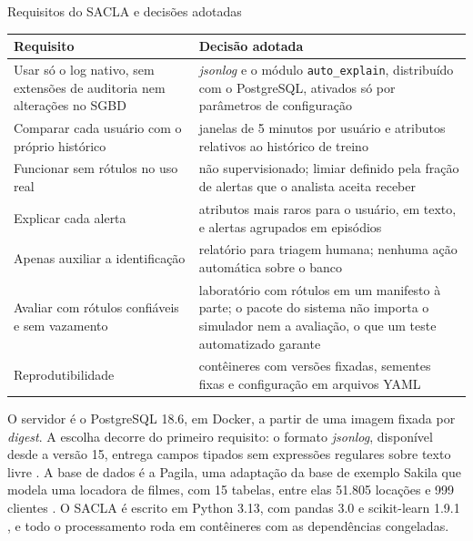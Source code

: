 \begin{quadro}[htb]
    \centering
    \ABNTEXfontereduzida
    \begin{minipage}{\textwidth}
        \caption{\label{qdr:requisitos}Requisitos do SACLA e decisões adotadas}
        \begin{tabular}{|L{6.0cm}|L{9.1cm}|}
            \hline
            \textbf{Requisito} & \textbf{Decisão adotada} \\
            \hline
            Usar só o log nativo, sem extensões de auditoria nem alterações no SGBD &
            \textit{jsonlog} e o módulo \texttt{auto\_explain}, distribuído com o PostgreSQL,
            ativados só por parâmetros de configuração \\
            \hline
            Comparar cada usuário com o próprio histórico &
            janelas de 5 minutos por usuário e atributos relativos ao histórico de treino \\
            \hline
            Funcionar sem rótulos no uso real &
            \iforest{} não supervisionado; limiar definido pela fração de alertas que o analista
            aceita receber \\
            \hline
            Explicar cada alerta &
            atributos mais raros para o usuário, em texto, e alertas agrupados em episódios \\
            \hline
            Apenas auxiliar a identificação &
            relatório para triagem humana; nenhuma ação automática sobre o banco \\
            \hline
            Avaliar com rótulos confiáveis e sem vazamento &
            laboratório com rótulos em um manifesto à parte; o pacote do sistema não importa o
            simulador nem a avaliação, o que um teste automatizado garante \\
            \hline
            Reprodutibilidade &
            contêineres com versões fixadas, sementes fixas e configuração em arquivos YAML \\
            \hline
        \end{tabular}
    \end{minipage}
\end{quadro}

O servidor é o PostgreSQL 18.6, em Docker, a partir de uma imagem fixada por
\textit{digest}. A escolha decorre do primeiro requisito: o formato \textit{jsonlog}, disponível
desde a versão 15, entrega campos tipados sem expressões regulares sobre texto livre
\cite{postgresql2025a}. A base de dados é a Pagila, uma adaptação da base de exemplo Sakila que
modela uma locadora de filmes, com 15 tabelas, entre elas 51.805 locações e 999 clientes
\cite{pagila2026}. O SACLA é escrito em Python 3.13, com pandas 3.0 e scikit-learn 1.9.1
\cite{pedregosa2011}, e todo o processamento roda em contêineres com as dependências
congeladas.

